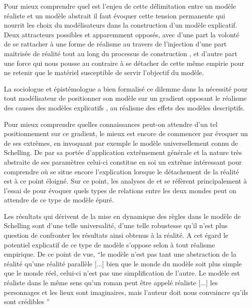 
Pour mieux comprendre quel est l'enjeu de cette délimitation entre un modèle réaliste et un modèle abstrait il faut évoquer cette tension permanente qui nourrit les choix du modélisateurs dans la construction d'un modèle explicatif. Deux attracteurs possibles et apparemment opposés, avec d'une part la volonté de se rattacher à une forme de réalisme au travers de l'injection d'une part maitrisée de réalité tout au long du processus de construction , et d'autre part une force qui nous pousse au contraire à se détacher de cette même empirie pour ne retenir que le matériel susceptible de servir l'objectif du modèle.

La sociologue et épistémologue \textcite{Bulle2005} a bien formalisé ce dilemme dans la nécessité pour tout modélisateur de positionner son modèle sur un gradient opposant le réalisme des causes des modèles explicatifs , au réalisme des effets des modèles descriptifs. 

Pour mieux comprendre quelles connaissances peut-on attendre d'un tel positionnement sur ce gradient, le mieux est encore de commencer par évoquer un de ses extrêmes, en invoquant par exemple le modèle universellement connu de Schelling. De par sa portée d'application extrêmement générale et la nature très abstraite de ses paramètres celui-ci constitue en soi un extrême intéressant pour comprendre où se situe encore l'explication lorsque le détachement de la réalité est à ce point éloigné. Sur ce point, les analyses de \textcite{Bulle2005} et \textcite{Phan2008, Phan2010} se réfèrent principalement à l'essai de \textcite{Sugden2002} pour évoquer quels types de relations entre les deux mondes peut on attendre de ce type de modèle épuré. 

Les résultats qui dérivent de la mise en dynamique des règles dans le modèle de Schelling sont d'une telle universalité, d'une telle robustesse qu'il n'est plus question de confronter les résultats ainsi obtenus à la réalité. A cet égard le potentiel explicatif de ce type de modèle s'oppose selon \textcite{Bulle2005} à tout réalisme empirique. De ce point de vue, \enquote{le modèle n'est pas tant une abstraction de la réalité qu’une réalité parallèle [...] bien que le monde du modèle soit plus simple que le monde réel, celui-ci n'est pas une simplification de l'autre. Le modèle est réaliste dans le même sens qu'un roman peut être appelé réaliste [...] les personnages et les lieux sont imaginaires, mais l'auteur doit nous convaincre qu'ils sont crédibles } \autocites[131]{Sugden2002}[10]{Phan2008}

